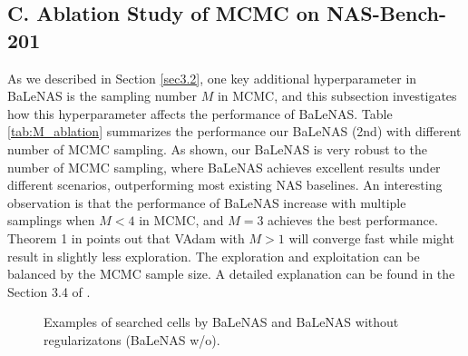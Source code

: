 \documentclass[10pt,twocolumn,letterpaper]{article}
\begin{document}
\subsection*{C. Ablation Study of MCMC on NAS-Bench-201}
As we described in Section \ref{sec3.2}, one key additional hyperparameter in BaLeNAS is the sampling number $M$ in MCMC, and this subsection investigates how this hyperparameter affects the performance of BaLeNAS. Table \ref{tab:M_ablation} summarizes the performance our BaLeNAS (2nd) with different number of MCMC sampling. As shown, our BaLeNAS is very robust to the  number of MCMC sampling, where BaLeNAS achieves excellent results under different scenarios, outperforming most existing NAS baselines. An interesting observation is that the performance of BaLeNAS increase with multiple samplings when $M<4$ in MCMC, and $M=3$ achieves the best performance. Theorem 1 in \cite{khan2018fast} points out that VAdam with $M>1$ will converge fast while might result in slightly less exploration. The exploration and exploitation can be balanced by the MCMC sample size. A detailed explanation can be found in the Section 3.4 of \cite{khan2018fast}. 








\begin{figure}
  
  
  
 \caption{Examples of searched cells by BaLeNAS and BaLeNAS without regularizatons (BaLeNAS w/o).}
 \label{fig:cellexamples}
\end{figure}
\end{document}
